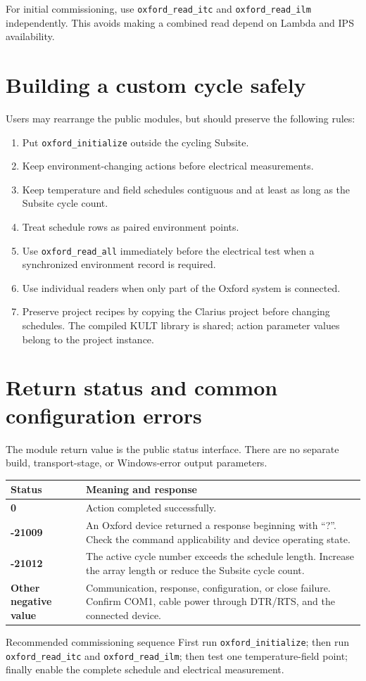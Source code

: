 \documentclass[10pt,a4paper]{article}
\newcommand{\api}[1]{\nolinkurl{#1}}
\begin{document}
For initial commissioning, use \api{oxford_read_itc} and
\api{oxford_read_ilm} independently. This avoids making a combined read depend
on Lambda and IPS availability.

\section{Building a custom cycle safely}

Users may rearrange the public modules, but should preserve the following
rules:

\begin{enumerate}
  \item Put \api{oxford_initialize} outside the cycling Subsite.
  \item Keep environment-changing actions before electrical measurements.
  \item Keep temperature and field schedules contiguous and at least as long
        as the Subsite cycle count.
  \item Treat schedule rows as paired environment points.
  \item Use \api{oxford_read_all} immediately before the electrical test when
        a synchronized environment record is required.
  \item Use individual readers when only part of the Oxford system is
        connected.
  \item Preserve project recipes by copying the Clarius project before
        changing schedules. The compiled KULT library is shared; action
        parameter values belong to the project instance.
\end{enumerate}

\section{Return status and common configuration errors}

The module return value is the public status interface. There are no separate
build, transport-stage, or Windows-error output parameters.

\begin{tabularx}{\textwidth}{@{}>{\bfseries\color{OxfordDark}}l X@{}}
\toprule
\textbf{Status} & \textbf{Meaning and response} \\
\midrule
0 & Action completed successfully. \\
-21009 & An Oxford device returned a response beginning with ``?''. Check the
command applicability and device operating state. \\
-21012 & The active cycle number exceeds the schedule length. Increase the
array length or reduce the Subsite cycle count. \\
Other negative value & Communication, response, configuration, or close
failure. Confirm COM1, cable power through DTR/RTS, and the connected device. \\
\bottomrule
\end{tabularx}

\begin{apibox}{Recommended commissioning sequence}
First run \api{oxford_initialize}; then run \api{oxford_read_itc} and
\api{oxford_read_ilm}; then test one temperature-field point; finally enable
the complete schedule and electrical measurement.
\end{apibox}
\end{document}
